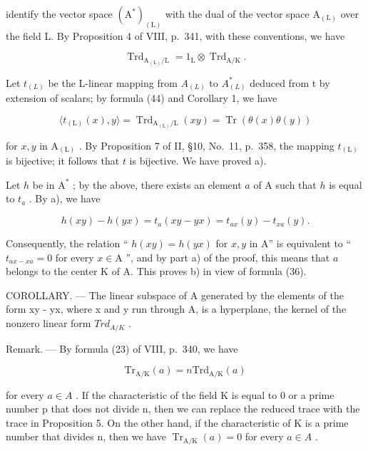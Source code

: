 identify the vector space \((\mathrm{A}^{*})_{(\mathrm{L})}\) with the dual of the vector space \(\mathrm{A}_{(\mathrm{L})}\) over the field L. By Proposition 4 of VIII, p.~341, with these conventions, we have

\[
\operatorname{Trd} _ {\mathrm{A} _ {(\mathrm{L})} / \mathrm{L}} = 1 _ {\mathrm{L}} \otimes \operatorname{Trd} _ {\mathrm{A} / \mathrm{K}}.\tag{44}
\]

Let \(t_{(L)}\) be the L-linear mapping from \(A_{(L)}\) to \(A_{(L)}^{*}\) deduced from t by extension of scalars; by formula (44) and Corollary 1, we have

\[
\langle t _ {(\mathrm{L})} (x), y \rangle = \operatorname{Trd} _ {\mathrm{A} _ {(\mathrm{L})} / \mathrm{L}} (x y) = \operatorname{Tr} (\theta (x) \theta (y))\tag{45}
\]

for \(x, y\) in \(\mathrm{A}_{(\mathrm{L})}\) . By Proposition 7 of II, §10, No.~11, p.~358, the mapping \(t_{(\mathrm{L})}\) is bijective; it follows that \(t\) is bijective. We have proved a).

Let \(h\) be in \(\mathrm{A}^*\) ; by the above, there exists an element \(a\) of \(\mathrm{A}\) such that \(h\) is equal to \(t_a\) . By a), we have

\[
h (x y) - h (y x) = t _ {a} (x y - y x) = t _ {a x} (y) - t _ {x a} (y).
\]

Consequently, the relation `` \(h(xy) = h(yx)\) for \(x,y\) in A'' is equivalent to `` \(t_{ax-xa} = 0\) for every \(x \in \mathrm{A}\) '', and by part a) of the proof, this means that \(a\) belongs to the center K of A. This proves b) in view of formula (36).

COROLLARY. --- The linear subspace of A generated by the elements of the form xy - yx, where x and y run through A, is a hyperplane, the kernel of the nonzero linear form \(Trd_{A/K}\) .

Remark. --- By formula (23) of VIII, p.~340, we have

\[
\mathrm{Tr} _ {\mathrm{A/K}} (a) = n \mathrm{Trd} _ {\mathrm{A/K}} (a)
\]

for every \(a \in A\) . If the characteristic of the field K is equal to 0 or a prime number p that does not divide n, then we can replace the reduced trace with the trace in Proposition 5. On the other hand, if the characteristic of K is a prime number that divides n, then we have \(\operatorname{Tr}_{\mathrm{A}/\mathrm{K}}(a) = 0\) for every \(a \in A\) .

